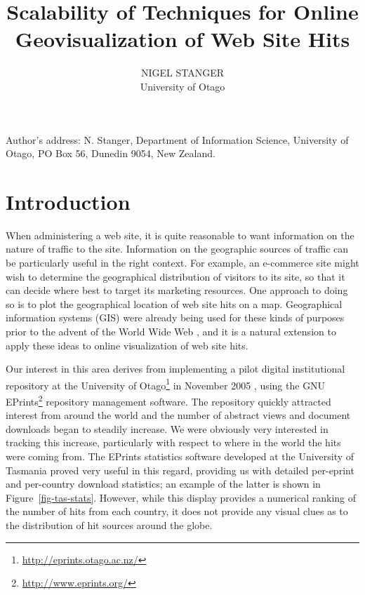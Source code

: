 \documentclass[acmtocl,acmnow]{acmtrans2m}
\title{Scalability of Techniques for Online Geovisualization of Web Site Hits}
\author{NIGEL STANGER \\ University of Otago}
\begin{document}


            
\begin{bottomstuff} 
Author's address: N. Stanger, Department of Information Science,
University of Otago, PO Box 56, Dunedin 9054, New Zealand.
\end{bottomstuff}
            
\maketitle


\section{Introduction}
\label{sec-introduction}

When administering a web site, it is quite reasonable to want
information on the nature of traffic to the site. Information on the
geographic sources of traffic can be particularly useful in the right
context. For example, an e-commerce site might wish to determine the
geographical distribution of visitors to its site, so that it can decide
where best to target its marketing resources. One approach to doing so
is to plot the geographical location of web site hits on a map.
Geographical information systems (GIS) were already being used for these
kinds of purposes prior to the advent of the World Wide Web
\cite{Beau-JR-1991-GIS}, and it is a natural extension to apply these
ideas to online visualization of web site hits.

Our interest in this area derives from implementing a pilot digital
institutional repository at the University of
Otago\footnote{\url{http://eprints.otago.ac.nz/}} in November 2005
\cite{Stan-N-2006-running}, using the GNU
EPrints\footnote{\url{http://www.eprints.org/}} repository management
software. The repository quickly attracted interest from around the
world and the number of abstract views and document downloads began to
steadily increase. We were obviously very interested in tracking this
increase, particularly with respect to where in the world the hits were
coming from. The EPrints statistics software developed at the University
of Tasmania \cite{Sale-A-2006-stats} proved very useful in this regard,
providing us with detailed per-eprint and per-country download
statistics; an example of the latter is shown in
Figure~\ref{fig-tas-stats}. However, while this display provides a
numerical ranking of the number of hits from each country, it does not
provide any visual clues as to the distribution of hit sources around
the globe.
\end{document}

